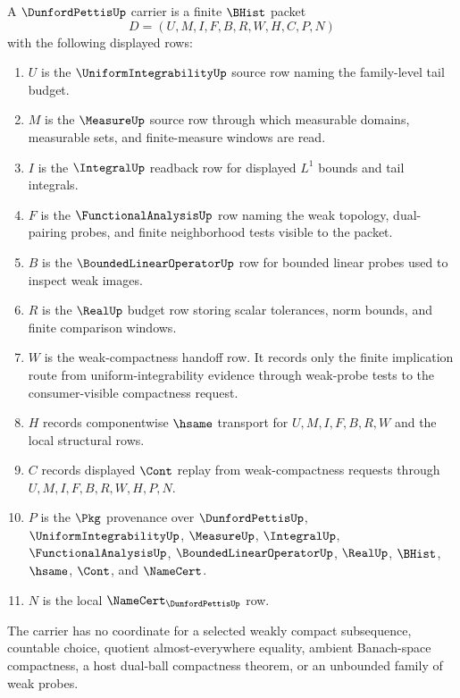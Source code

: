 \begin{definition}
\label{def:dunford-pettis-carrier}
A $\DunfordPettisUp$ carrier is a finite $\BHist$ packet
$$
D=(U,M,I,F,B,R,W,H,C,P,N)
$$
with the following displayed rows:
\begin{enumerate}
\item $U$ is the $\UniformIntegrabilityUp$ source row naming the family-level tail budget.
\item $M$ is the $\MeasureUp$ source row through which measurable domains, measurable sets, and finite-measure windows are read.
\item $I$ is the $\IntegralUp$ readback row for displayed $L^{1}$ bounds and tail integrals.
\item $F$ is the $\FunctionalAnalysisUp$ row naming the weak topology, dual-pairing probes, and finite neighborhood tests visible to the packet.
\item $B$ is the $\BoundedLinearOperatorUp$ row for bounded linear probes used to inspect weak images.
\item $R$ is the $\RealUp$ budget row storing scalar tolerances, norm bounds, and finite comparison windows.
\item $W$ is the weak-compactness handoff row. It records only the finite implication route from uniform-integrability evidence through weak-probe tests to the consumer-visible compactness request.
\item $H$ records componentwise $\hsame$ transport for $U,M,I,F,B,R,W$ and the local structural rows.
\item $C$ records displayed $\Cont$ replay from weak-compactness requests through $U,M,I,F,B,R,W,H,P,N$.
\item $P$ is the $\Pkg$ provenance over $\DunfordPettisUp$, $\UniformIntegrabilityUp$, $\MeasureUp$, $\IntegralUp$, $\FunctionalAnalysisUp$, $\BoundedLinearOperatorUp$, $\RealUp$, $\BHist$, $\hsame$, $\Cont$, and $\NameCert$.
\item $N$ is the local $\NameCert_{\DunfordPettisUp}$ row.
\end{enumerate}
The carrier has no coordinate for a selected weakly compact subsequence, countable choice, quotient almost-everywhere equality, ambient Banach-space compactness, a host dual-ball compactness theorem, or an unbounded family of weak probes.
\end{definition}

